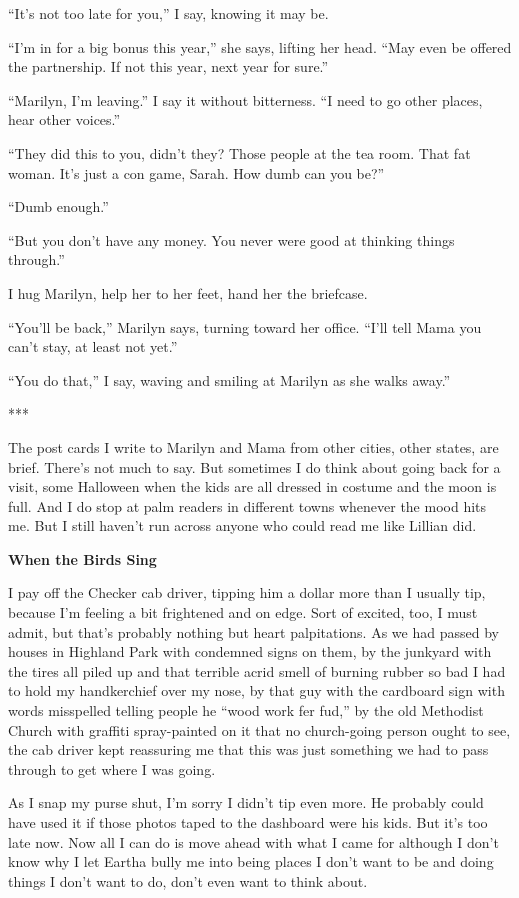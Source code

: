 \documentclass[
]{article}
\begin{document}
``It's not too late for you,'' I say, knowing it may be.

``I'm in for a big bonus this year,'' she says, lifting her head. ``May
even be offered the partner­ship. If not this year, next year for
sure.''

``Marilyn, I'm leaving.'' I say it without bitterness. ``I need to go
other places, hear other voices.''

``They did this to you, didn't they? Those people at the tea room. That
fat woman. It's just a con game, Sarah. How dumb can you be?''

``Dumb enough.''

``But you don't have any money. You never were good at thinking things
through.''

I hug Marilyn, help her to her feet, hand her the briefcase.

``You'll be back,'' Marilyn says, turning toward her office. ``I'll tell
Mama you can't stay, at least not yet.''

``You do that,'' I say, waving and smiling at Marilyn as she walks
away.''

***

The post cards I write to Marilyn and Mama from other cities, other
states, are brief. There's not much to say. But sometimes I do think
about going back for a visit, some Halloween when the kids are all
dressed in costume and the moon is full. And I do stop at palm readers
in different towns whenever the mood hits me. But I still haven't run
across anyone who could read me like Lillian did.

\textbf{\hfill\break
}

\textbf{When the Birds Sing}

I pay off the Checker cab driver, tipping him a dollar more than I
usually tip, because I'm feel­ing a bit frightened and on edge. Sort of
excited, too, I must admit, but that's probably nothing but heart
palpitations. As we had passed by houses in Highland Park with condemned
signs on them, by the junkyard with the tires all piled up and that
terrible acrid smell of burning rubber so bad I had to hold my
handkerchief over my nose, by that guy with the cardboard sign with
words misspelled telling people he ``wood work fer fud,'' by the old
Methodist Church with graffiti spray-painted on it that no church-going
person ought to see, the cab driver kept reassuring me that this was
just something we had to pass through to get where I was going.

As I snap my purse shut, I'm sorry I didn't tip even more. He probably
could have used it if those photos taped to the dashboard were his kids.
But it's too late now. Now all I can do is move ahead with what I came
for although I don't know why I let Eartha bully me into being places I
don't want to be and doing things I don't want to do, don't even want to
think about.
\end{document}

